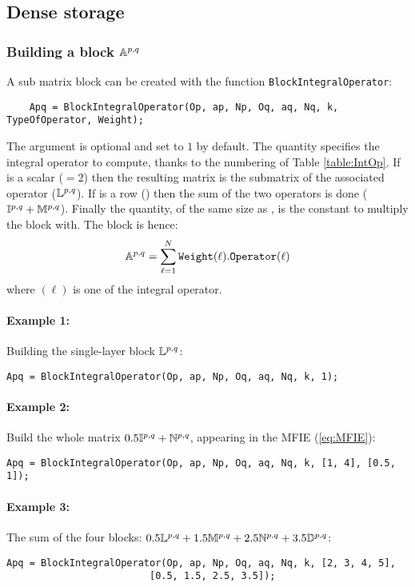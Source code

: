 \subsection{Dense storage}
\subsubsection{Building a block $\mathbb{A}^{p,q}$}

A sub matrix block can be created with the function \texttt{BlockIntegralOperator}:
\begin{verbatim}
	Apq = BlockIntegralOperator(Op, ap, Np, Oq, aq, Nq, k, TypeOfOperator, Weight);
\end{verbatim}
The  argument is optional and set to $1$ by default. The quantity  specifies the integral operator to compute, thanks to the numbering of Table \ref{table:IntOp}. If  is a scalar (\eg $=2$) then the resulting matrix  is the submatrix of the associated operator (\eg $\mathbb{L}^{p,q}$). If  is a row (\eg \code{[1,3]}) then the sum of the two operators is done (\eg $\mathbb{I}^{p,q}+\mathbb{M}^{p,q}$). Finally the  quantity, of the same size as , is the constant to multiply the block with. The block is hence:
$$
\mathbb{A}^{p,q} = \sum_{\ell=1}^{N}\texttt{Weight}(\ell).\texttt{Operator}(\ell)
$$
where $(\ell)$ is one of the integral operator.

\paragraph{Example 1:} Building the single-layer block $\mathbb{L}^{p,q}$:
\begin{verbatim}
Apq = BlockIntegralOperator(Op, ap, Np, Oq, aq, Nq, k, 1);
\end{verbatim}
\paragraph{Example 2:} Build the whole matrix $0.5\mathbb{I}^{p,q} + \mathbb{N}^{p,q}$, appearing in the MFIE (\ref{eq:MFIE}):
\begin{verbatim}
Apq = BlockIntegralOperator(Op, ap, Np, Oq, aq, Nq, k, [1, 4], [0.5, 1]);
\end{verbatim}
\paragraph{Example 3:} The sum of the four blocks: $0.5\mathbb{L}^{p,q} + 1.5\mathbb{M}^{p,q} + 2.5\mathbb{N}^{p,q} + 3.5\mathbb{D}^{p,q}$:
\begin{verbatim}
Apq = BlockIntegralOperator(Op, ap, Np, Oq, aq, Nq, k, [2, 3, 4, 5], 
                         [0.5, 1.5, 2.5, 3.5]);
\end{verbatim}


